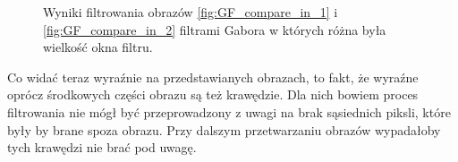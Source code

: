 \begin{figure}[ht]
  \caption{Wyniki filtrowania obrazów \ref{fig:GF_compare_in_1} i \ref{fig:GF_compare_in_2} filtrami Gabora w których różna była wielkość okna filtru.}
  \label{fig:GF_compare}
\end{figure}

Co widać teraz wyraźnie na przedstawianych obrazach, to fakt, że wyraźne oprócz środkowych części obrazu są też krawędzie. Dla nich bowiem proces filtrowania nie mógł być przeprowadzony z uwagi na brak sąsiednich piksli, które były by brane spoza obrazu. Przy dalszym przetwarzaniu obrazów wypadałoby tych krawędzi nie brać pod uwagę.

